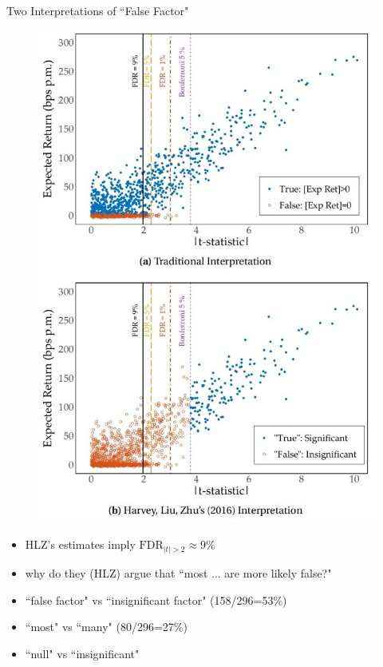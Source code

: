\documentclass[UTF8, 16pt]{beamer}
\begin{document}
\begin{CJK*}{UTF8}{gbsn}
\begin{frame}{Two Interpretations of ``False Factor"}
\begin{multicols}{2}
	\begin{figure}[htpb]
  		\begin{center}
    	\includegraphics[width=0.88 \linewidth]
    	{pic/SMM.jpg}
  		\end{center}
	\end{figure}
	\begin{itemize}
		\item HLZ’s estimates imply $\mathrm{FDR}_{|t|>2} \approx 9 \%$
		\item why do they (HLZ) argue that ``most ... are more likely false?"
		\item ``false factor" vs ``insignificant factor"  (158/296=53\%)
		\item ``most" vs ``many" (80/296=27\%)
		\item ``null" vs ``insignificant"
	\end{itemize}
\end{multicols}
\end{frame}


\end{CJK*}
\end{document}
